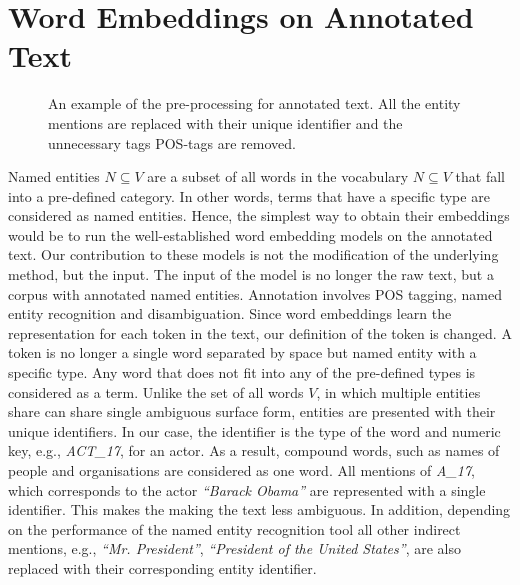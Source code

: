 \section{Word Embeddings on Annotated Text}\label{sec:annotated}
\begin{figure}
\centering 
\resizebox{0.85\textwidth}{0.28\textwidth}{      

}
\caption{An example of the pre-processing for annotated text. All the entity mentions are replaced with their unique identifier and the unnecessary tags POS-tags are removed.}
\label{fig:annotation}
\end{figure}
Named entities $N \subseteq V$ are a subset of all words in the vocabulary $N\subseteq V$ that fall into a pre-defined category.
In other words, terms that have a specific type are considered as named entities. Hence, the simplest way to obtain their embeddings would be to run the well-established word embedding models on the annotated text. Our contribution to these models is not the modification of the underlying method, but the input. The input of the model is no longer the raw text, but a corpus with annotated named entities. Annotation involves POS tagging, named entity recognition and disambiguation.
Since word embeddings learn the representation for each token in the text, our definition of the token is changed. A token is no longer a single word separated by space but named entity with a specific type. Any word that does not fit into any of the pre-defined types is considered as a term. Unlike the set of all words $V$, in which multiple entities share can share single ambiguous surface form, entities are presented with their unique identifiers. In our case, the identifier is the type of the word and numeric key, e.g., \emph{ACT\_17}, for an actor. As a result, compound words, such as names of people and organisations are considered as one word. All mentions of \emph{A\_17}, which corresponds to the actor \emph{``Barack Obama''} are represented with a single identifier.
This makes the making the text less ambiguous.
In addition, depending on the performance of the named entity recognition tool all other indirect mentions, e.g., \emph{``Mr. President''}, \emph{``President of the United States''}, are also replaced with their corresponding entity identifier.
